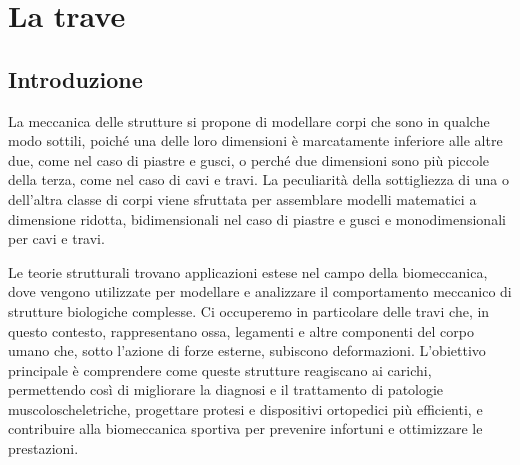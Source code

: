 \chapter{La trave}


\section{Introduzione}
La meccanica delle strutture si propone di modellare corpi che sono in qualche modo sottili, poiché una delle loro dimensioni è marcatamente inferiore alle altre due, come nel caso di piastre e gusci, o perché due dimensioni sono più piccole della terza, come nel caso di cavi e travi. La peculiarità della sottigliezza di una o dell'altra classe di corpi viene sfruttata per assemblare modelli matematici a dimensione ridotta, bidimensionali nel caso di piastre e gusci e monodimensionali per cavi e travi.

Le teorie strutturali  trovano applicazioni estese  nel campo della biomeccanica, dove vengono utilizzate per modellare e analizzare il comportamento meccanico di strutture biologiche complesse.
Ci occuperemo in particolare delle travi che, in questo contesto, rappresentano ossa, legamenti e altre componenti del corpo umano che, sotto l'azione di forze esterne, subiscono deformazioni. L'obiettivo principale è comprendere come queste strutture reagiscano ai carichi, permettendo così di migliorare la diagnosi e il trattamento di patologie muscoloscheletriche, progettare protesi e dispositivi ortopedici più efficienti, e contribuire alla biomeccanica sportiva per prevenire infortuni e ottimizzare le prestazioni.


